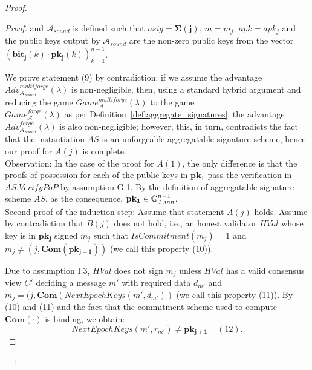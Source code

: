 \begin{proof}
\begin{proof}
\noindent and $\mathcal{A}_{\mathit{sound}}$ is defined such that $\mathit{asig} = \mathbf{\Sigma(j)}$, $m = m_j$, 
$\mathit{apk} = \mathit{apk_j}$ and the public keys output by $\mathcal{A}_{\mathit{sound}}$ are the non-zero public 
keys from the vector $(\mathbf{bit_j}(k) \cdot \mathbf{pk_j}(k))_{k=1}^{n-1}$.

\noindent We prove statement (9) by contradiction: if we assume the advantage 
$\mathit{Adv}^{\mathit{multiforge}}_{\mathcal{A}_{\mathit{sound}}}({\lambda})$ is non-negligible, 
then, using a standard hybrid argument and reducing the game 
$\mathit{Game}^{\mathit{multiforge}}_{\mathcal{A}}({\lambda})$ to the game \\
$\mathit{Game}^{\mathit{forge}}_{\mathcal{A}}({\lambda})$ as per Definition~\ref{def:aggregate_signatures}, 
the advantage $\mathit{Adv}^{\mathit{forge}}_{\mathcal{A}_{\mathit{sound}}}({\lambda})$ is also non-negligible; 
however, this, in turn, contradicts the fact that the instantiation $\mathit{AS}$ is an unforgeable 
aggregatable signature scheme, hence our proof for $A(j)$ is complete.  \\

\noindent Observation: In the case of the proof for $A(1)$, the only difference is that the proofs of possession for each of the public 
keys in $\mathbf{pk_1}$ pass the verification in $\mathit{AS.VerifyPoP}$ by assumption G.1. By the definition of aggregatable signature 
scheme $\mathit{AS}$, as the consequence, $\mathbf{pk_1} \in \mathbb{G}_{\mathit{1,inn}}^{n-1}$.\\

\noindent Second proof of the induction step: Assume that statement $A(j)$ holds. 
 Assume by contradiction that $B(j)$ does not hold, i.e., an honest validator $\mathit{HVal}$ whose key is in $\mathbf{pk_j}$ signed $m_j$ such that 
$\mathit{IsCommitment}(m_j) = 1$ and $m_j \neq (j, \mathbf{Com}(\mathbf{pk_{j+1}}))$ (we call this property (10)).

\noindent Due to assumption I.3, $\mathit{HVal}$ does not sign $m_j$ unless $\mathit{HVal}$ has a valid consensus view $C'$ deciding 
a message $m'$ with required data $d_{m'}$ and  $m_j = (j, \mathbf{Com}(\mathit{NextEpochKeys}(m', d_{m'}))$ 
(we call this property (11)). By (10) and (11) and the fact that the commitment scheme used to compute $\mathbf{Com}(\cdot)$ is binding,  we obtain:
$$\mathit{NextEpochKeys}(m', r_{m'}) \neq \mathbf{pk_{j+1}} \ \ \ \ \ (12).$$


\end{proof}
\end{proof}
